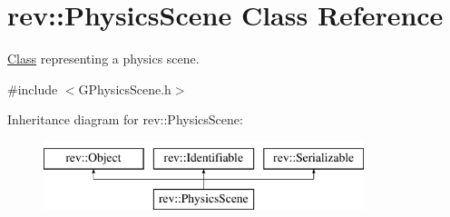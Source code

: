 \hypertarget{classrev_1_1_physics_scene}{}\section{rev\+::Physics\+Scene Class Reference}
\label{classrev_1_1_physics_scene}


\mbox{\hyperlink{struct_class}{Class}} representing a physics scene.  




{\ttfamily \#include $<$G\+Physics\+Scene.\+h$>$}

Inheritance diagram for rev\+::Physics\+Scene\+:\begin{figure}[H]
\begin{center}
\leavevmode
\includegraphics[height=2.000000cm]{classrev_1_1_physics_scene}
\end{center}
\end{figure}
